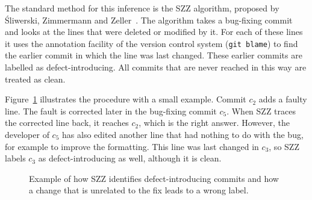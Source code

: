 \documentclass[12pt,a4paper,oneside]{report}
\begin{document}
The standard method for this inference is the SZZ algorithm, proposed by
\'{S}liwerski, Zimmermann and Zeller~\cite{sliwerski2005szz}. The algorithm
takes a bug-fixing commit and looks at the lines that were deleted or modified
by it. For each of these lines it uses the annotation facility of the version
control system (\texttt{git blame}) to find the earlier commit in which the
line was last changed. These earlier commits are labelled as
defect-introducing. All commits that are never reached in this way are treated
as clean.

Figure~\ref{fig:szzexample} illustrates the procedure with a small example.
Commit $c_2$ adds a faulty line. The fault is corrected later in the
bug-fixing commit $c_5$. When SZZ traces the corrected line back, it reaches
$c_2$, which is the right answer. However, the developer of $c_5$ has also
edited another line that had nothing to do with the bug, for example to
improve the formatting. This line was last changed in $c_3$, so SZZ labels
$c_3$ as defect-introducing as well, although it is clean.

\begin{figure}[htbp]
\centering
{}
\caption{Example of how SZZ identifies defect-introducing commits and how a
change that is unrelated to the fix leads to a wrong label.}
\label{fig:szzexample}
\end{figure}
\end{document}
